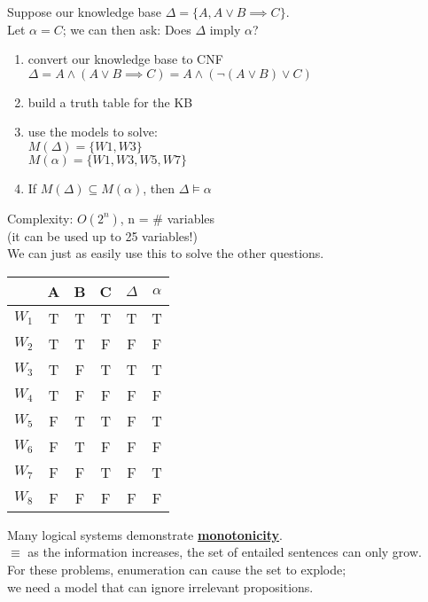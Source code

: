 \documentclass[../../lecture_notes.tex]{subfiles}
\begin{document}
\begin{center} \begin{minipage}{0.6\textwidth}
\noindent Suppose our knowledge base $\Delta = \{A, A \lor B \implies C\}$.\\
Let $\alpha = C$; we can then ask: Does $\Delta$ imply $\alpha$?
\begin{enumerate} [itemsep=0mm]
	\item convert our knowledge base to CNF\\
		$\Delta = A \land (A \lor B \implies C) = A \land (\neg(A \lor B) \lor C)$
	\item build a truth table for the KB
	\item use the models to solve:\\
		$M(\Delta) = \{W1, W3\}$\\
		$M(\alpha) = \{W1, W3, W5, W7\}$
	\item If $M(\Delta) \subseteq M(\alpha)$, then $\Delta \models \alpha$
\end{enumerate}
\noindent Complexity: $O(2^n)$, n = \# variables \\(it can be used up to 25 variables!)\\
We can just as easily use this to solve the other questions.
\end{minipage}%
\begin{minipage}{0.4\textwidth}
\begin{tabular}{ | c || c | c | c | c | c | }
	\hline
	& A & B & C & $\Delta$ & $\alpha$\\ 
	\hline\hline
	$W_1$ & T & T & T & T & T\\
	\hline
	$W_2$ & T & T & F & F & F\\
	\hline
	$W_3$ & T & F & T & T & T\\
	\hline
	$W_4$ & T & F & F & F & F\\
	\hline
	$W_5$ & F & T & T & F & T\\
	\hline
	$W_6$ & F & T & F & F & F\\
	\hline
	$W_7$ & F & F & T & F & T\\
	\hline
	$W_8$ & F & F & F & F & F\\
	\hline
\end{tabular} \end{minipage} \end{center}

\noindent Many logical systems demonstrate \textbf{\underline{monotonicity}}.\\
\indent $\equiv$ as the information increases, the set of entailed sentences can only grow.\\
For these problems, enumeration can cause the set to explode;\\
\indent we need a model that can ignore irrelevant propositions.
\end{document}
